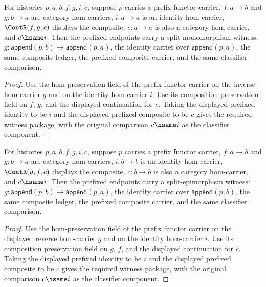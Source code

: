 \begin{theorem}
\label{thm:prefix-functor-carrier-split-mono-witness-preserves}
For histories $p,a,b,f,g,i,c$, suppose $p$ carries a prefix functor carrier,
$f:a\to b$ and $g:b\to a$ are category hom-carriers, $i:a\to a$ is an
identity hom-carrier, $\ContR(f,g,c)$ displays the composite, $c:a\to a$ is
also a category hom-carrier, and $c\hsame i$. Then the prefixed endpoints carry
a split-monomorphism witness: $g:\mathsf{append}(p,b)\to\mathsf{append}(p,a)$,
the identity carrier over $\mathsf{append}(p,a)$, the same composite ledger,
the prefixed composite carrier, and the same classifier comparison.
\end{theorem}
\begin{proof}
Use the hom-preservation field of the prefix functor carrier on the inverse
hom-carrier $g$ and on the identity hom-carrier $i$. Use its composition
preservation field on $f$, $g$, and the displayed continuation for $c$. Taking
the displayed prefixed identity to be $i$ and the displayed prefixed composite
to be $c$ gives the required witness package, with the original comparison
$c\hsame i$ as the classifier component.
\end{proof}

\begin{theorem}
\label{thm:prefix-functor-carrier-split-epi-witness-preserves}
For histories $p,a,b,f,g,i,c$, suppose $p$ carries a prefix functor carrier,
$f:a\to b$ and $g:b\to a$ are category hom-carriers, $i:b\to b$ is an
identity hom-carrier, $\ContR(g,f,c)$ displays the composite, $c:b\to b$ is
also a category hom-carrier, and $c\hsame i$. Then the prefixed endpoints carry
a split-epimorphism witness: $g:\mathsf{append}(p,b)\to\mathsf{append}(p,a)$,
the identity carrier over $\mathsf{append}(p,b)$, the same composite ledger,
the prefixed composite carrier, and the same classifier comparison.
\end{theorem}
\begin{proof}
Use the hom-preservation field of the prefix functor carrier on the displayed
reverse hom-carrier $g$ and on the identity hom-carrier $i$. Use its
composition preservation field on $g$, $f$, and the displayed continuation for
$c$. Taking the displayed prefixed identity to be $i$ and the displayed
prefixed composite to be $c$ gives the required witness package, with the
original comparison $c\hsame i$ as the classifier component.
\end{proof}

